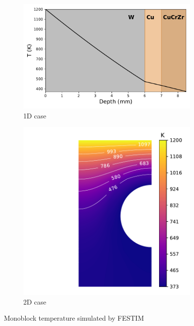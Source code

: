 \begin{figure}[ht]
    \centering
    \begin{subfigure}{0.5\linewidth}                              
        \includegraphics[width=\linewidth]{Figures/Chapter3/monoblocks/interface_condition/iter case/temperature_1D.pdf}
        \caption{1D case}
        \label{fig: 1D temperature}
    \end{subfigure}%
    \begin{subfigure}{0.5\linewidth}                          
        \includegraphics[width=\linewidth]{Figures/Chapter3/monoblocks/interface_condition/iter case/temperature_field_2d.pdf}
        \caption{2D case}
        \label{fig: 2D temperature}
    \end{subfigure}%
    \caption{Monoblock temperature simulated by FESTIM}
    \label{fig: temperature}
\end{figure}

